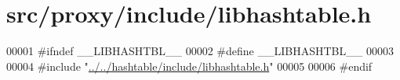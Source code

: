 \hypertarget{proxy_2include_2libhashtable_8h_source}{
\section{src/proxy/include/libhashtable.h}
}

\begin{DoxyCode}
00001 \textcolor{preprocessor}{#ifndef \_\_LIBHASHTBL\_\_}
00002 \textcolor{preprocessor}{}\textcolor{preprocessor}{#define \_\_LIBHASHTBL\_\_}
00003 \textcolor{preprocessor}{}
00004 \textcolor{preprocessor}{#include "\hyperlink{hashtable_2include_2libhashtable_8h}{../../hashtable/include/libhashtable.h}"}
00005 
00006 \textcolor{preprocessor}{#endif}
\end{DoxyCode}
